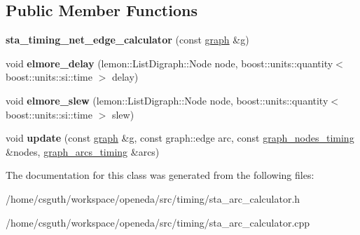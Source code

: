 \subsection*{Public Member Functions}
\begin{DoxyCompactItemize}
\item 
\hypertarget{classophidian_1_1timing_1_1sta__timing__net__edge__calculator_a3ffa2d1f1277e2710244d369b6a1b43b}{{\bfseries sta\-\_\-timing\-\_\-net\-\_\-edge\-\_\-calculator} (const \hyperlink{classophidian_1_1timing_1_1graph}{graph} \&g)}\label{classophidian_1_1timing_1_1sta__timing__net__edge__calculator_a3ffa2d1f1277e2710244d369b6a1b43b}

\item 
\hypertarget{classophidian_1_1timing_1_1sta__timing__net__edge__calculator_ae32b4f4ac34c93696461cfa9b522d637}{void {\bfseries elmore\-\_\-delay} (lemon\-::\-List\-Digraph\-::\-Node node, boost\-::units\-::quantity$<$ boost\-::units\-::si\-::time $>$ delay)}\label{classophidian_1_1timing_1_1sta__timing__net__edge__calculator_ae32b4f4ac34c93696461cfa9b522d637}

\item 
\hypertarget{classophidian_1_1timing_1_1sta__timing__net__edge__calculator_af4a5d464ed082b9eaf1a2b66f6773e19}{void {\bfseries elmore\-\_\-slew} (lemon\-::\-List\-Digraph\-::\-Node node, boost\-::units\-::quantity$<$ boost\-::units\-::si\-::time $>$ slew)}\label{classophidian_1_1timing_1_1sta__timing__net__edge__calculator_af4a5d464ed082b9eaf1a2b66f6773e19}

\item 
\hypertarget{classophidian_1_1timing_1_1sta__timing__net__edge__calculator_ae86054b615d75b84346404dc87489b82}{void {\bfseries update} (const \hyperlink{classophidian_1_1timing_1_1graph}{graph} \&g, const graph\-::edge arc, const \hyperlink{classophidian_1_1timing_1_1graph__nodes__timing}{graph\-\_\-nodes\-\_\-timing} \&nodes, \hyperlink{classophidian_1_1timing_1_1graph__arcs__timing}{graph\-\_\-arcs\-\_\-timing} \&arcs)}\label{classophidian_1_1timing_1_1sta__timing__net__edge__calculator_ae86054b615d75b84346404dc87489b82}

\end{DoxyCompactItemize}


The documentation for this class was generated from the following files\-:\begin{DoxyCompactItemize}
\item 
/home/csguth/workspace/openeda/src/timing/sta\-\_\-arc\-\_\-calculator.\-h\item 
/home/csguth/workspace/openeda/src/timing/sta\-\_\-arc\-\_\-calculator.\-cpp\end{DoxyCompactItemize}
